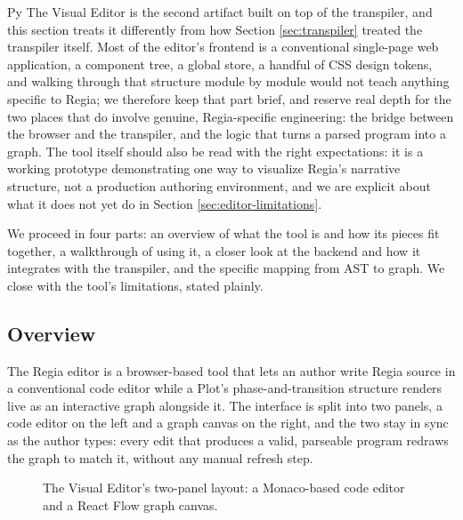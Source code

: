 \begin{codeblock}[]{Py}
The Visual Editor is the second artifact built on top of the transpiler, and this section treats it differently from how Section \ref{sec:transpiler} treated the transpiler itself. Most of the editor's frontend is a conventional single-page web application, a component tree, a global store, a handful of CSS design tokens, and walking through that structure module by module would not teach anything specific to Regia; we therefore keep that part brief, and reserve real depth for the two places that do involve genuine, Regia-specific engineering: the bridge between the browser and the transpiler, and the logic that turns a parsed program into a graph. The tool itself should also be read with the right expectations: it is a working prototype demonstrating one way to visualize Regia's narrative structure, not a production authoring environment, and we are explicit about what it does not yet do in Section \ref{sec:editor-limitations}.

We proceed in four parts: an overview of what the tool is and how its pieces fit together, a walkthrough of using it, a closer look at the backend and how it integrates with the transpiler, and the specific mapping from AST to graph. We close with the tool's limitations, stated plainly.

\subsection{Overview}
\label{sec:editor-overview}
The Regia editor is a browser-based tool that lets an author write Regia source in a conventional code editor while a Plot's phase-and-transition structure renders live as an interactive graph alongside it. The interface is split into two panels, a code editor on the left and a graph canvas on the right, and the two stay in sync as the author types: every edit that produces a valid, parseable program redraws the graph to match it, without any manual refresh step.

\begin{figure}[h]
    \centering
    \caption{The Visual Editor's two-panel layout: a Monaco-based code editor and a React Flow graph canvas.}
    \label{fig:editor-two-panel}
\end{figure}


\end{codeblock}
